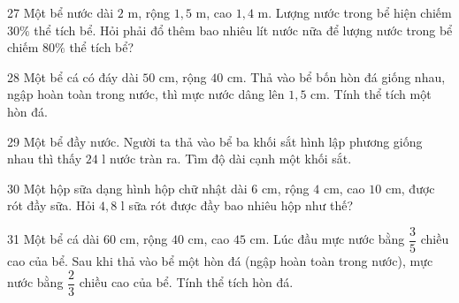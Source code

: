\gap
\begin{probbox}{27}{\relax}
Một bể nước dài $2$ m, rộng $1{,}5$ m, cao $1{,}4$ m. Lượng nước trong bể hiện chiếm $30\%$ thể tích bể. Hỏi phải đổ thêm bao nhiêu lít nước nữa để lượng nước trong bể chiếm $80\%$ thể tích bể?
\end{probbox}
\gap
\begin{probbox}{28}{\relax}
Một bể cá có đáy dài $50$ cm, rộng $40$ cm. Thả vào bể bốn hòn đá giống nhau, ngập hoàn toàn trong nước, thì mực nước dâng lên $1{,}5$ cm. Tính thể tích một hòn đá.
\end{probbox}
\gap
\begin{probbox}{29}{\relax}
Một bể đầy nước. Người ta thả vào bể ba khối sắt hình lập phương giống nhau thì thấy $24$ l nước tràn ra. Tìm độ dài cạnh một khối sắt.
\end{probbox}
\gap
\begin{probbox}{30}{\relax}
Một hộp sữa dạng hình hộp chữ nhật dài $6$ cm, rộng $4$ cm, cao $10$ cm, được rót đầy sữa. Hỏi $4{,}8$ l sữa rót được đầy bao nhiêu hộp như thế?
\end{probbox}
\begin{probbox}{31}{}
Một bể cá dài $60$ cm, rộng $40$ cm, cao $45$ cm. Lúc đầu mực nước bằng $\dfrac35$ chiều cao của bể. Sau khi thả vào bể một hòn đá (ngập hoàn toàn trong nước), mực nước bằng $\dfrac23$ chiều cao của bể. Tính thể tích hòn đá.
\end{probbox}
